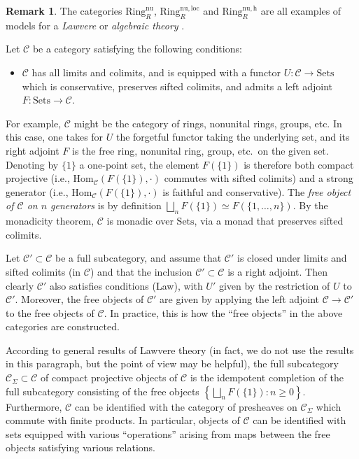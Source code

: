 \documentclass{amsart}
\renewcommand{\hom}{\mathrm{Hom}}
\theoremstyle{definition}
\newtheorem{remark}[definition]{Remark}
\newcommand{\nuloc}{\mathrm{Ring}^{\mathrm{nu,loc}}_R}
\newcommand{\nur}{\mathrm{Ring}^{\mathrm{nu}}_R}
\newcommand{\nuh}{\mathrm{Ring}^{\mathrm{nu,h}}_R}
\begin{document}
\begin{remark}\label{remark_Lawvere}
The categories $\nur$, $\nuloc$ and $\nuh$ are all examples of models for a {\em
Lawvere} or {\em algebraic theory} \cite[Ch.~3]{ARloc} \cite[Ch.~3]{Borceux}.

Let $\mathcal{C}$ be a category satisfying the following conditions: 


\begin{itemize}
\item[(Law)] $\mathcal C$ has all limits and colimits, and is equipped with a
functor $U \colon \mathcal C\to \mathrm{Sets}$ which is conservative, preserves
sifted colimits, and admits a left adjoint $F \colon \mathrm{Sets}\to\mathcal C$.
\end{itemize}
For example, $\mathcal C$ might be the category of rings, nonunital rings,
groups, etc.  In this case, one takes for $U$ the forgetful functor taking the
underlying set, and its right adjoint $F$ is the free ring, nonunital ring,
group, etc.~on the given set. Denoting by $\{1\}$ a one-point set, the element
$F(\{1\})$ is therefore both compact projective (i.e.,
$\hom_{\mathcal{C}}(F(\{1\}), \cdot)$ commutes with sifted colimits) and a
strong generator (i.e., $\hom_{\mathcal{C}}(F(\{1\}), \cdot)$ is faithful and
conservative). The {\em free object of $\mathcal C$ on $n$ generators} is by
definition $\bigsqcup_nF(\{1\})\simeq F(\{1,\dots,n\})$. By the monadicity
theorem, $\mathcal{C}$ is monadic over $\mathrm{Sets}$, via a monad that
preserves sifted colimits. 

Let $\mathcal C'\subset \mathcal C$ be a full subcategory, and assume that
$\mathcal C'$ is closed under limits and sifted colimits (in $\mathcal C$) and that the inclusion $\mathcal C'\subset\mathcal C$ is a right adjoint. Then clearly $\mathcal C'$ also satisfies conditions (Law), with $U'$ given by the restriction of $U$ to $\mathcal C'$. Moreover, the free objects of $\mathcal C'$ are given by applying the left adjoint $\mathcal C\to \mathcal C'$ to the free objects of $\mathcal C$. In practice, this is 
how the ``free objects'' in the above categories are constructed. 

According to general results of Lawvere theory \cite[Thm.~3.9.1]{Borceux} (in fact, we do not use the
results in this paragraph, but the point of view may be helpful), the full
subcategory  $\mathcal{C}_{\Sigma} \subset \mathcal{C}$ of compact projective objects of
$\mathcal{C}$ is the idempotent completion of the full subcategory consisting of
the free objects $\left\{\bigsqcup_{n} F(\{1\}) : n \geq 0\right\}$. Furthermore, $\mathcal{C}$ can be identified with the category of presheaves on $\mathcal{C}_\Sigma$ which commute with finite products. In particular, objects of $\mathcal{C}$ can be identified with sets equipped with various ``operations'' arising from maps between the free objects satisfying various relations. 
\end{remark}
\end{document}

